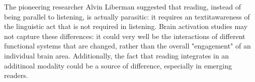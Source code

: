 The pioneering researcher Alvin Liberman suggested that reading, instead of being parallel to listening, is actually parasitic: it requires an textit{awareness} of the linguistic act that is not required in listening. Brain activation studies may not capture these differences: it could very well be the interactions of different functional systems that are changed, rather than the overall "engagement" of an individual brain area. Additionally, the fact that reading integrates in an additinoal modality could be a source of difference, especially in emerging readers. 


